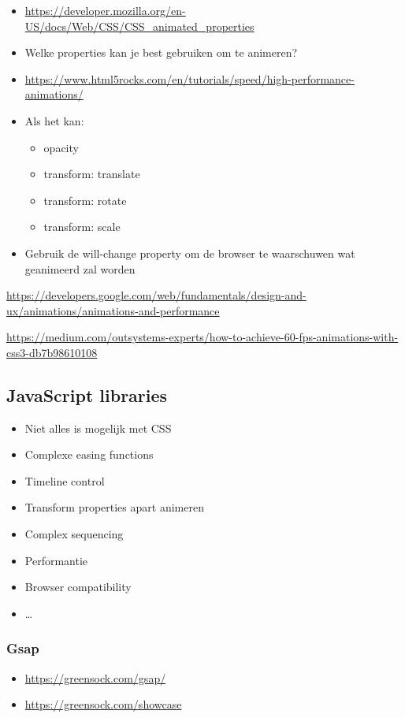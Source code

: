 \documentclass{article}
\begin{document}
\begin{itemize}
    \item \url{https://developer.mozilla.org/en-US/docs/Web/CSS/CSS_animated_properties}
    \item Welke properties kan je best gebruiken om te animeren?
    \item \url{https://www.html5rocks.com/en/tutorials/speed/high-performance-animations/}
    \item Als het kan:
    \begin{itemize}
        \item opacity
        \item transform: translate
        \item transform: rotate
        \item transform: scale
    \end{itemize}
    \item Gebruik de will-change property om de browser te waarschuwen wat geanimeerd zal worden    
\end{itemize}

\url{https://developers.google.com/web/fundamentals/design-and-ux/animations/animations-and-performance}

\url{https://medium.com/outsystems-experts/how-to-achieve-60-fps-animations-with-css3-db7b98610108}

\subsection{JavaScript libraries}

\begin{itemize}
    \item Niet alles is mogelijk met CSS
    \item Complexe easing functions
    \item Timeline control
    \item Transform properties apart animeren
    \item Complex sequencing
    \item Performantie
    \item Browser compatibility
    \item \dots
\end{itemize}

\subsubsection{Gsap}

\begin{itemize}
    \item \url{https://greensock.com/gsap/}
    \item \url{https://greensock.com/showcase}
\end{itemize}
\end{document}
